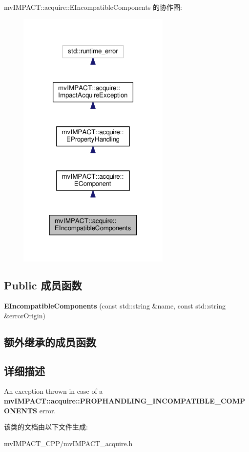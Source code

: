 mv\+I\+M\+P\+A\+C\+T\+:\+:acquire\+:\+:E\+Incompatible\+Components 的协作图\+:
\nopagebreak
\begin{figure}[H]
\begin{center}
\leavevmode
\includegraphics[width=214pt]{classmv_i_m_p_a_c_t_1_1acquire_1_1_e_incompatible_components__coll__graph}
\end{center}
\end{figure}
\subsection*{Public 成员函数}
\begin{DoxyCompactItemize}
\item 
\hypertarget{classmv_i_m_p_a_c_t_1_1acquire_1_1_e_incompatible_components_a73cc9de48c3b86e7ed3731540dd3852d}{{\bfseries E\+Incompatible\+Components} (const std\+::string \&name, const std\+::string \&error\+Origin)}\label{classmv_i_m_p_a_c_t_1_1acquire_1_1_e_incompatible_components_a73cc9de48c3b86e7ed3731540dd3852d}

\end{DoxyCompactItemize}
\subsection*{额外继承的成员函数}


\subsection{详细描述}
An exception thrown in case of a {\bfseries mv\+I\+M\+P\+A\+C\+T\+::acquire\+::\+P\+R\+O\+P\+H\+A\+N\+D\+L\+I\+N\+G\+\_\+\+I\+N\+C\+O\+M\+P\+A\+T\+I\+B\+L\+E\+\_\+\+C\+O\+M\+P\+O\+N\+E\+N\+T\+S} error. 

该类的文档由以下文件生成\+:\begin{DoxyCompactItemize}
\item 
mv\+I\+M\+P\+A\+C\+T\+\_\+\+C\+P\+P/mv\+I\+M\+P\+A\+C\+T\+\_\+acquire.\+h\end{DoxyCompactItemize}
